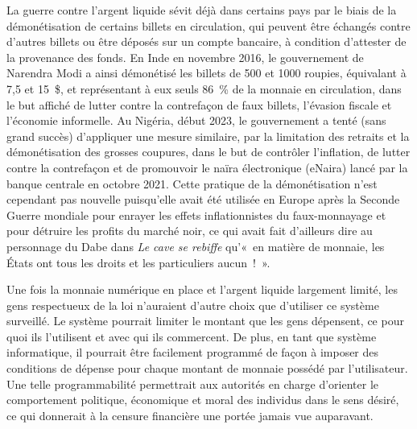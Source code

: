 La guerre contre l'argent liquide sévit déjà dans certains pays par le biais de la démonétisation de certains billets en circulation, qui peuvent être échangés contre d'autres billets ou être déposés sur un compte bancaire, à condition d'attester de la provenance des fonds. En Inde en novembre 2016, le gouvernement de Narendra Modi a ainsi démonétisé les billets de 500 et 1000 roupies, équivalant à 7,5 et 15~\$, et représentant à eux seuls 86~\% de la monnaie en circulation, dans le but affiché de lutter contre la contrefaçon de faux billets, l'évasion fiscale et l'économie informelle. Au Nigéria, début 2023, le gouvernement a tenté (sans grand succès) d'appliquer une mesure similaire, par la limitation des retraits et la démonétisation des grosses coupures, dans le but de contrôler l'inflation, de lutter contre la contrefaçon et de promouvoir le naïra électronique (eNaira) lancé par la banque centrale en octobre 2021. Cette pratique de la démonétisation n'est cependant pas nouvelle puisqu'elle avait été utilisée en Europe après la Seconde Guerre mondiale pour enrayer les effets inflationnistes du faux-monnayage et pour détruire les profits du marché noir, ce qui avait fait d'ailleurs dire au personnage du Dabe dans \emph{Le cave se rebiffe} qu'«~en matière de monnaie, les États ont tous les droits et les particuliers aucun~!~».


Une fois la monnaie numérique en place et l'argent liquide largement limité, les gens respectueux de la loi n'auraient d'autre choix que d'utiliser ce système surveillé. Le système pourrait limiter le montant que les gens dépensent, ce pour quoi ils l'utilisent et avec qui ils commercent. De plus, en tant que système informatique, il pourrait être facilement programmé de façon à imposer des conditions de dépense pour chaque montant de monnaie possédé par l'utilisateur. Une telle programmabilité permettrait aux autorités en charge d'orienter le comportement politique, économique et moral des individus dans le sens désiré, ce qui donnerait à la censure financière une portée jamais vue auparavant.

